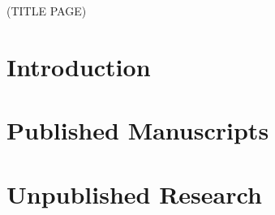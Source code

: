 \documentclass[letterpaper,11pt]{report}
\title{\EDSTITLE}
\author{\EDSAUTHOR}
\date{\today}
\newcounter{insertpages}
\begin{document}
(TITLE PAGE)\newpage
\newpage
\newpage
\tableofcontents\newpage
\listoftables\newpage
\listoffigures\newpage

\setcounter{chapter}{0}
\chapter{Introduction}\label{ch:introduction}


\chapter{Published Manuscripts}\label{ch:published-manuscripts}

\setcounter{insertpages}{0}

\chapter{Unpublished Research}\label{ch:unpublished-research}

\setcounter{insertpages}{0}
\end{document}
